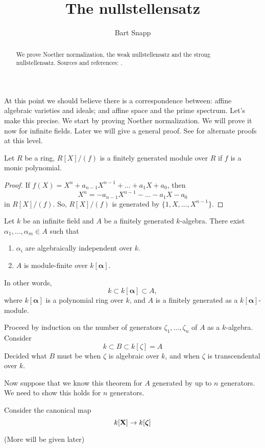 \documentclass{ximera}
\author{Bart Snapp}
\title{The nullstellensatz}
\begin{document}
\begin{abstract}
  We prove Noether normalization, the weak nullstellensatz and the
  strong nullstellensatz. Sources and references:
  \cite{AM1969,dE1995,hM1986,mR1995}.
\end{abstract}
\maketitle


At this point we should believe there is a correspondence between:
affine algebraic varieties and ideals; and affine space and the prime
spectrum. Let's make this precise. We start by proving Noether
normalization. We will prove it now for infinite fields. Later we will
give a general proof. See \cite{iK1966,gK2011,eK1991} for alternate
proofs at this level.


\begin{proposition}\label{P:finiteext}
  Let $R$ be a ring, $R[X]/(f)$ is a finitely generated module over
  $R$ if $f$ is a monic polynomial.
  \begin{proof}
    If $f(X) = X^n + a_{n-1}X^{n-1} + \dots + a_1 X + a_0$, then
    \[
    X^n = -a_{n-1}X^{n-1} - \dots - a_1 X - a_0
    \]
    in $R[X]/(f)$. So, $R[X]/(f)$ is generated by
    $\{1,X,\dots,X^{n-1}\}$.
  \end{proof}
\end{proposition}


\begin{theorem}
  Let $k$ be an infinite field and $A$ be a finitely generated
  $k$-algebra. There exist $\alpha_1,\dots,\alpha_m\in A$ such that
  \begin{enumerate}
  \item $\alpha_i$ are algebraically independent over $k$.
  \item $A$ is module-finite over $k[\boldsymbol{\alpha}]$.
  \end{enumerate}
  In other words, 
  \[
  k\subset k[\boldsymbol{\alpha}] \subset A,
  \]
  where $k[\boldsymbol{\alpha}]$ is a polynomial ring over $k$, and
  $A$ is a finitely generated as a $k[\boldsymbol{\alpha}]$-module.
  \begin{sketch}
    Proceed by induction on the number of generators
    $\zeta_1,\dots,\zeta_n$ of $A$ as a $k$-algebra. Consider
    \[
    k \subset B \subset k[\zeta] = A
    \]
    Decided what $B$ must be when $\zeta$ is algebraic over $k$, and
    when $\zeta$ is transcendental over $k$.

    Now suppose that we know this theorem for $A$ generated by up to
    $n$ generators. We need to show this holds for $n$ generators.

    Consider the canonical map
    \[
    k[\mathbf X] \to k[\boldsymbol{\zeta}]
    \]


    (More will be given later)
  \end{sketch}
\end{theorem}
\end{document}
